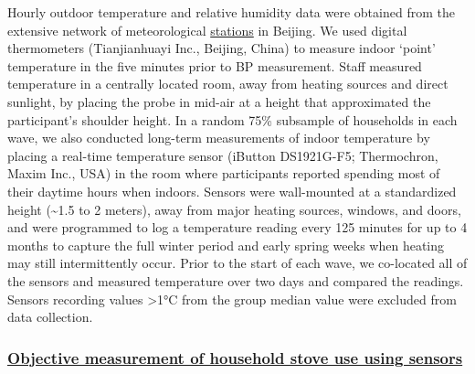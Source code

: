 \documentclass[
  letterpaper,
  DIV=11,
  numbers=noendperiod]{scrartcl}
\providecommand{\DIFadd}[1]{{\protect\color{blue}\underline{#1}}} %
\providecommand{\DIFaddbegin}{} %
\providecommand{\DIFaddend}{} %
\providecommand{\DIFdelbegin}{} %
\providecommand{\DIFdelend}{} %
\newcommand{\DIFscaledelfig}{0.5}
\newlength{\DIFdelgraphicswidth} %
\newlength{\DIFdelgraphicsheight} %
\newcommand{\DIFaddincludegraphics}[2][]{{\color{blue}\fbox{\DIFOincludegraphics[#1]{#2}}}} %
\newcommand{\DIFdelincludegraphics}[2][]{%
\sbox{\DIFdelgraphicsbox}{\DIFOincludegraphics[#1]{#2}}%
\settoboxwidth{\DIFdelgraphicswidth}{\DIFdelgraphicsbox} %
\settoboxtotalheight{\DIFdelgraphicsheight}{\DIFdelgraphicsbox} %
\scalebox{\DIFscaledelfig}{%
\parbox[b]{\DIFdelgraphicswidth}{\usebox{\DIFdelgraphicsbox}\\[-\baselineskip] \rule{\DIFdelgraphicswidth}{0em}}\llap{\resizebox{\DIFdelgraphicswidth}{\DIFdelgraphicsheight}{%
\setlength{\unitlength}{\DIFdelgraphicswidth}%
\begin{picture}(1,1)%
\thicklines\linethickness{2pt} %
{\color[rgb]{1,0,0}\put(0,0){\framebox(1,1){}}}%
{\color[rgb]{1,0,0}\put(0,0){\line( 1,1){1}}}%
{\color[rgb]{1,0,0}\put(0,1){\line(1,-1){1}}}%
\end{picture}%
}\hspace*{3pt}}} %
} %
\DeclareRobustCommand{\DIFaddbegin}{\DIFOaddbegin \let\includegraphics\DIFaddincludegraphics} %
\DeclareRobustCommand{\DIFaddend}{\DIFOaddend \let\includegraphics\DIFOincludegraphics} %
\DeclareRobustCommand{\DIFdelbegin}{\DIFOdelbegin \let\includegraphics\DIFdelincludegraphics} %
\DeclareRobustCommand{\DIFdelend}{\DIFOaddend \let\includegraphics\DIFOincludegraphics} %
\begin{document}
Hourly outdoor temperature and relative humidity data were obtained from
the extensive network of meteorological
\href{http://beijingair.sinaapp.com}{stations} in Beijing. We used
digital thermometers (Tianjianhuayi Inc., Beijing, China) to measure
indoor `point' temperature in the five minutes prior to BP measurement.
Staff measured temperature in a centrally located room, away from
heating sources and direct sunlight, by placing the probe in mid-air at
a height that approximated the participant's shoulder height. In a
random 75\% subsample of households in each wave, we also conducted
long-term measurements of indoor temperature by placing a real-time
temperature sensor (iButton DS1921G-F5; Thermochron, Maxim Inc., USA) in
the room where participants reported spending most of their daytime
hours when indoors. Sensors were wall-mounted at a standardized height
(\textasciitilde1.5 to 2 meters), away from major heating sources,
windows, and doors, and were programmed to log a temperature reading
every 125 minutes for up to 4 months to capture the full winter period
and early spring weeks when heating may still intermittently occur.
Prior to the start of each wave, we co-located all of the sensors and
measured temperature over two days and compared the readings. Sensors
recording values \textgreater1°C from the group median value were
excluded from data collection.

\DIFdelbegin %
\DIFdelend \DIFaddbegin \subsubsection{\DIFadd{Objective measurement of household stove use using
sensors}}\label{objective-measurement-of-household-stove-use-using-sensors}
\DIFaddend 
\end{document}
